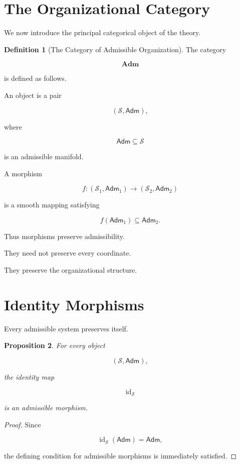 \documentclass[11pt,oneside]{book}
\numberwithin{equation}{chapter}
\theoremstyle{definition}
\newtheorem{definition}{Definition}[chapter]
\theoremstyle{plain}
\newtheorem{proposition}[definition]{Proposition}
\DeclareMathOperator{\id}{id}
\newcommand{\State}{\mathcal{S}}
\newcommand{\Adm}{\mathsf{Adm}}
\begin{document}
\section{The Organizational Category}

We now introduce the principal categorical object of the theory.

\begin{definition}[The Category of Admissible Organization]

The category

\[
\mathbf{Adm}
\]

is defined as follows.

An object is a pair

\[
(\State,\Adm),
\]

where

\[
\Adm
\subseteq
\State
\]

is an admissible manifold.

A morphism

\[
f:
(\State_1,\Adm_1)
\rightarrow
(\State_2,\Adm_2)
\]

is a smooth mapping satisfying

\[
f(\Adm_1)
\subseteq
\Adm_2.
\]

\end{definition}

Thus morphisms preserve admissibility.

They need not preserve every coordinate.

They preserve the organizational structure.

\section{Identity Morphisms}

Every admissible system preserves itself.

\begin{proposition}

For every object

\[
(\State,\Adm),
\]

the identity map

\[
\id_{\State}
\]

is an admissible morphism.

\end{proposition}

\begin{proof}

Since

\[
\id_{\State}(\Adm)=\Adm,
\]

the defining condition for admissible morphisms is immediately satisfied.

\end{proof}
\end{document}

